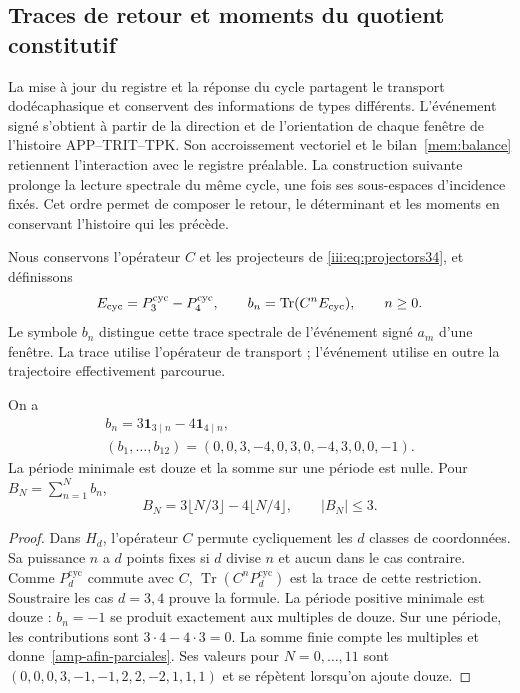 \subsection{Traces de retour et moments du quotient constitutif}
\label{amp-afin-sec}

La mise à jour du registre et la réponse du cycle partagent le
transport dodécaphasique et conservent des informations de types différents.
L’événement signé s’obtient à partir de la direction et de l’orientation de chaque
fenêtre de l’histoire APP--TRIT--TPK. Son accroissement vectoriel et le
bilan~\eqref{mem:balance} retiennent l’interaction avec le registre préalable.
La construction suivante prolonge la lecture spectrale du même cycle,
une fois ses sous-espaces d’incidence fixés. Cet ordre permet de composer
le retour, le déterminant et les moments en conservant l’histoire qui les précède.

Nous conservons l’opérateur $C$ et les projecteurs de
\eqref{iii:eq:projectors34}, et définissons
\begin{equation}
 E_{\rm cyc}=P_3^{\mathrm{cyc}}-P_4^{\mathrm{cyc}},\qquad
 b_n=\operatorname{Tr}(C^n E_{\rm cyc}),\qquad n\geq0.
 \label{amp-afin-trazas}
\end{equation}
Le symbole $b_n$ distingue cette trace spectrale de l’événement signé
$a_m$ d’une fenêtre. La trace utilise l’opérateur de transport ;
l’événement utilise en outre la trajectoire effectivement parcourue.

\begin{proposition}
\label{amp-afin-prop-tabla}
On a
\begin{equation}
 \begin{gathered}
 b_n=3\mathbf1_{3\mid n}-4\mathbf1_{4\mid n},\\
 (b_1,\ldots,b_{12})=(0,0,3,-4,0,3,0,-4,3,0,0,-1).
 \end{gathered}
 \label{amp-afin-tabla}
\end{equation}
La période minimale est douze et la somme sur une période est nulle. Pour
$B_N=\sum_{n=1}^{N}b_n$,
\begin{equation}
 B_N=3\lfloor N/3\rfloor-4\lfloor N/4\rfloor,\qquad |B_N|\leq3.
 \label{amp-afin-parciales}
\end{equation}
\end{proposition}
\begin{proof}
Dans $H_d$, l’opérateur $C$ permute cycliquement les $d$ classes de
coordonnées. Sa puissance $n$ a $d$ points fixes si $d$ divise $n$
et aucun dans le cas contraire. Comme $P_d^{\mathrm{cyc}}$ commute avec $C$,
$\operatorname{Tr}(C^nP_d^{\mathrm{cyc}})$ est la trace de cette restriction.
Soustraire les cas $d=3,4$ prouve la formule. La période positive minimale
est douze : $b_n=-1$ se produit exactement aux multiples de douze.
Sur une période, les contributions sont $3\cdot4-4\cdot3=0$.
La somme finie compte les multiples et donne~\eqref{amp-afin-parciales}.
Ses valeurs pour $N=0,\ldots,11$ sont
$(0,0,0,3,-1,-1,2,2,-2,1,1,1)$ et se répètent lorsqu’on ajoute douze.
\end{proof}

